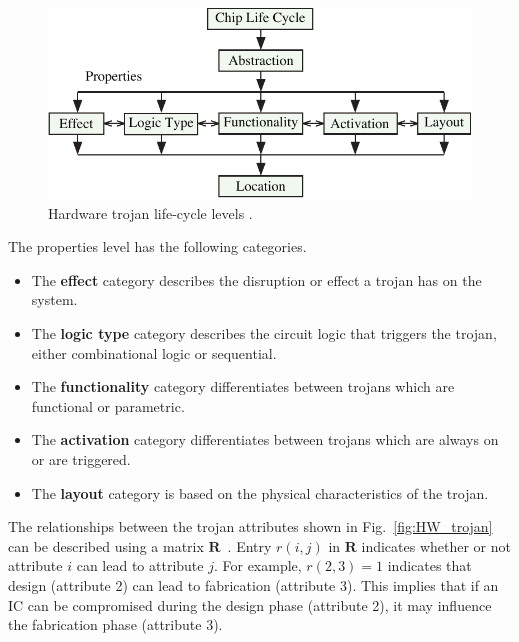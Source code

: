 \documentclass[conference]{IEEEtran}
\begin{document}
\begin{figure}[]
	\centering
	\includegraphics[width=0.99\linewidth]{../Thesis/Figures/trojan_life_cycle}
	\caption{Hardware trojan life-cycle levels \cite{samerAttribute}.}
	\label{fig:trojan_life_cycle}
\end{figure}
The properties level has the following categories.
\begin{itemize}
	\item The \textbf{effect} category describes the disruption or effect a trojan has on the system.
	\item The \textbf{logic type} category describes the circuit logic that triggers the trojan, either combinational logic or sequential.
	\item The \textbf{functionality} category differentiates between trojans which are functional or parametric.
	\item The \textbf{activation} category differentiates between trojans which are always on or are triggered.
	\item The \textbf{layout} category is based on the physical characteristics of the trojan.
\end{itemize}
The relationships between the trojan attributes shown in Fig.~\ref{fig:HW_trojan} can be described using a matrix $\mathbf{R}$~\cite{samerAttribute}.
Entry $r(i,j)$ in $\mathbf{R}$ indicates whether or not attribute $i$ can lead to attribute $j$.
For example, $r(2,3) = 1$ indicates that design (attribute 2) can lead to fabrication (attribute 3).
This implies that if an IC can be compromised during the design phase (attribute 2), it may influence the fabrication phase (attribute 3).
\end{document}
